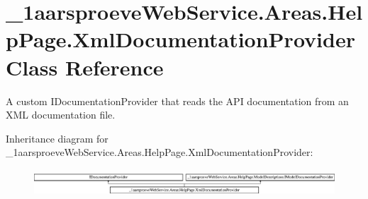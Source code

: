 \hypertarget{class__1aarsproeve_web_service_1_1_areas_1_1_help_page_1_1_xml_documentation_provider}{}\section{\+\_\+1aarsproeve\+Web\+Service.\+Areas.\+Help\+Page.\+Xml\+Documentation\+Provider Class Reference}
\label{class__1aarsproeve_web_service_1_1_areas_1_1_help_page_1_1_xml_documentation_provider}


A custom I\+Documentation\+Provider that reads the A\+P\+I documentation from an X\+M\+L documentation file.  


Inheritance diagram for \+\_\+1aarsproeve\+Web\+Service.\+Areas.\+Help\+Page.\+Xml\+Documentation\+Provider\+:\begin{figure}[H]
\begin{center}
\leavevmode
\includegraphics[height=1.021898cm]{class__1aarsproeve_web_service_1_1_areas_1_1_help_page_1_1_xml_documentation_provider}
\end{center}
\end{figure}
